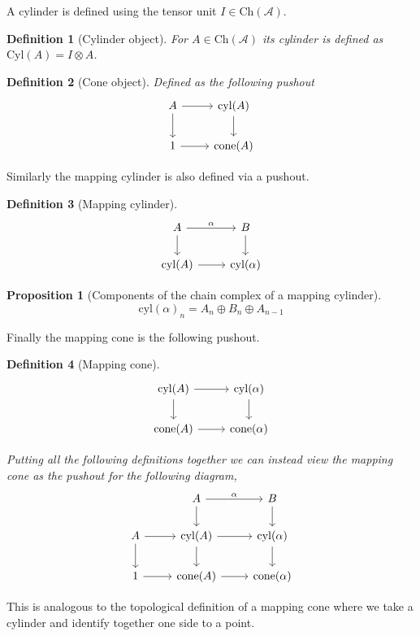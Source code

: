 \documentclass[12pt]{article}
\numberwithin{equation}{section}
\newtheorem{definition}{Definition}[section]
\newtheorem{proposition}{Proposition}[section]
\begin{document}
	A cylinder is defined using the tensor unit $I\in \mathrm{Ch}(\mathcal{A})$.
	\begin{definition}[Cylinder object]
		For $A \in \mathrm{Ch}(\mathcal{A})$ its cylinder is defined as $\mathrm{Cyl}(A)=I \otimes A$.
	\end{definition}
	\begin{definition}[Cone object]
		Defined as the following pushout
	\[\begin{tikzcd}
		A & {\mathrm{cyl}(A)} \\
		1 & {\mathrm{cone}(A)}
		\arrow[from=1-1, to=1-2]
		\arrow[from=1-1, to=2-1]
		\arrow[from=2-1, to=2-2]
		\arrow[from=1-2, to=2-2]
	\end{tikzcd}\]
	\end{definition}
	Similarly the mapping cylinder is also defined via a pushout.
	\begin{definition}[Mapping cylinder]\label{mappingcylinder}
		\[\begin{tikzcd}
			A & B \\
			{\mathrm{cyl}(A)} & {\mathrm{cyl}(\alpha)}
			\arrow["\alpha", from=1-1, to=1-2]
			\arrow[from=1-1, to=2-1]
			\arrow[from=1-2, to=2-2]
			\arrow[from=2-1, to=2-2]
		\end{tikzcd}\]
	
	\end{definition}
	
	\begin{proposition}[Components of the chain complex of a mapping cylinder]
		\[ \mathrm{cyl}(\alpha)_n=A_n\oplus B_n \oplus A_{n-1} \]
	\end{proposition}

Finally the mapping cone is the following pushout.
\begin{definition}[Mapping cone]\label{mappingcone}
	\[\begin{tikzcd}
		{\mathrm{cyl}(A)} & {\mathrm{cyl}(\alpha)} \\
		{\mathrm{cone}(A)} & {\mathrm{cone}(\alpha)}
		\arrow[from=1-1, to=1-2]
		\arrow[from=1-1, to=2-1]
		\arrow[from=1-2, to=2-2]
		\arrow[from=2-1, to=2-2]
	\end{tikzcd}\]
	
		Putting all the following definitions together we can instead view the mapping cone as the pushout for the following diagram,
	\[\begin{tikzcd}
		& A & B \\
		A & {\mathrm{cyl}(A)} & {\mathrm{cyl}(\alpha)} \\
		1 & {\mathrm{cone}(A)} & {\mathrm{cone}(\alpha)}
		\arrow[from=2-2, to=2-3]
		\arrow[from=2-2, to=3-2]
		\arrow[from=2-3, to=3-3]
		\arrow[from=3-2, to=3-3]
		\arrow["\alpha", from=1-2, to=1-3]
		\arrow[from=1-2, to=2-2]
		\arrow[from=1-3, to=2-3]
		\arrow[from=2-1, to=2-2]
		\arrow[from=2-1, to=3-1]
		\arrow[from=3-1, to=3-2]
	\end{tikzcd}\]
\end{definition}
This is analogous to the topological definition of a mapping cone where we take a cylinder and identify together one side to a point.
\end{document}
